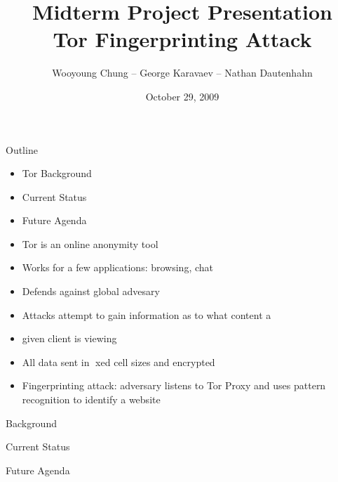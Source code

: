 \documentclass{beamer}
\title[Tor Fingerprinting Attack]{Midterm Project Presentation \\
Tor Fingerprinting Attack}
\author{Wooyoung Chung -- George Karavaev -- Nathan Dautenhahn}
\institute{Computer Security II \\ University of Illinois}
\date{October 29, 2009}
\begin{document}
\begin{frame}
\titlepage
\end{frame}


\begin{frame}{Outline}
\begin{itemize}
	\item Tor Background
	\item Current Status
	\item Future Agenda
\end{itemize}

\end{frame}
\begin{itemize}
	\item Tor is an online anonymity tool
	\item Works for a few applications: browsing, chat
	\item Defends against global advesary
	\item Attacks attempt to gain information as to what content a
	\item given client is viewing
	\item All data sent in xed cell sizes and encrypted
	\item Fingerprinting attack: adversary listens to Tor Proxy and uses
		 pattern recognition to identify a website
\end{itemize}

\begin{frame}{Background}

\end{frame}

\begin{frame}{Current Status}

\end{frame}

\begin{frame}{Future Agenda}
\end{frame}
\end{document}

